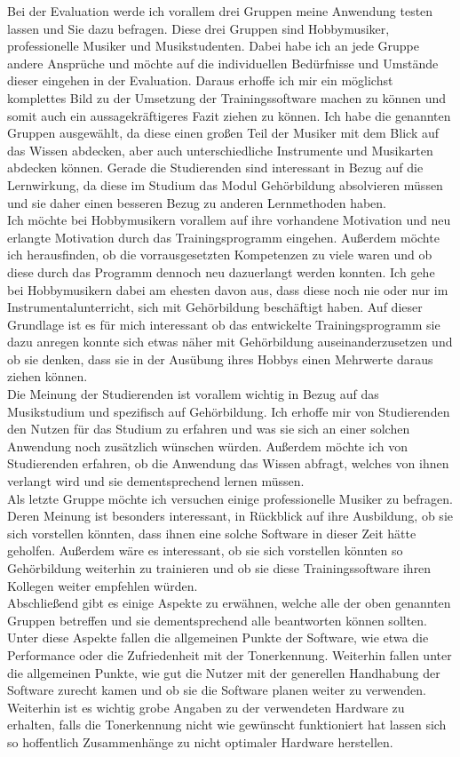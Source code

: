 Bei der Evaluation werde ich vorallem drei Gruppen meine Anwendung testen lassen und Sie dazu befragen. Diese drei Gruppen sind Hobbymusiker, professionelle Musiker und Musikstudenten. Dabei habe ich an jede Gruppe andere Ansprüche
und möchte auf die individuellen Bedürfnisse und Umstände dieser eingehen in der Evaluation. Daraus erhoffe ich mir ein möglichst komplettes Bild zu der Umsetzung der Trainingssoftware machen zu können und somit auch ein aussagekräftigeres Fazit ziehen zu können.
Ich habe die genannten Gruppen ausgewählt, da diese einen großen Teil der Musiker mit dem Blick auf das Wissen abdecken, aber auch unterschiedliche Instrumente und Musikarten abdecken können. Gerade die Studierenden sind interessant in Bezug auf die Lernwirkung, 
da diese im Studium das Modul Gehörbildung absolvieren müssen und sie daher einen besseren Bezug zu anderen Lernmethoden haben. \\
Ich möchte bei Hobbymusikern vorallem auf ihre vorhandene Motivation und neu erlangte Motivation durch das Trainingsprogramm eingehen. Außerdem möchte ich herausfinden, ob die vorrausgesetzten Kompetenzen zu viele waren und ob diese durch das Programm dennoch neu dazuerlangt werden konnten.
Ich gehe bei Hobbymusikern dabei am ehesten davon aus, dass diese noch nie oder nur im Instrumentalunterricht, sich mit Gehörbildung beschäftigt haben. Auf dieser Grundlage ist es für mich interessant ob 
das entwickelte Trainingsprogramm sie dazu anregen konnte sich etwas näher mit Gehörbildung auseinanderzusetzen und ob sie denken, dass sie in der Ausübung ihres Hobbys einen Mehrwerte daraus ziehen können. \\
Die Meinung der Studierenden ist vorallem wichtig in Bezug auf das Musikstudium und spezifisch auf Gehörbildung. Ich erhoffe mir von Studierenden den Nutzen für das Studium zu erfahren und was sie sich an einer solchen 
Anwendung noch zusätzlich wünschen würden. Außerdem möchte ich von Studierenden erfahren, ob die Anwendung das Wissen abfragt, welches von ihnen verlangt wird und sie dementsprechend lernen müssen.\\ 
Als letzte Gruppe möchte ich versuchen einige professionelle Musiker zu befragen. Deren Meinung ist besonders interessant, in Rückblick auf ihre Ausbildung, ob sie sich vorstellen könnten, dass ihnen eine solche Software in dieser Zeit
hätte geholfen. Außerdem wäre es interessant, ob sie sich vorstellen könnten so Gehörbildung weiterhin zu trainieren und ob sie diese Trainingssoftware ihren Kollegen weiter empfehlen würden.\\ 
Abschließend gibt es einige Aspekte zu erwähnen, welche alle der oben genannten Gruppen betreffen und sie dementsprechend alle beantworten können sollten. Unter diese Aspekte fallen die allgemeinen Punkte der Software, wie etwa die Performance oder die Zufriedenheit mit 
der Tonerkennung. Weiterhin fallen unter die allgemeinen Punkte, wie gut die Nutzer mit der generellen Handhabung der Software zurecht kamen und ob sie die Software planen weiter zu verwenden.
Weiterhin ist es wichtig grobe Angaben zu der verwendeten Hardware zu erhalten, falls die Tonerkennung nicht wie gewünscht funktioniert hat lassen sich so hoffentlich Zusammenhänge zu nicht optimaler Hardware herstellen.

